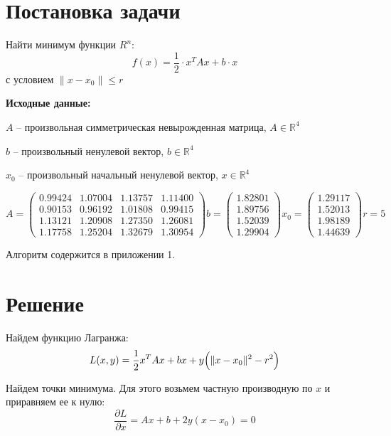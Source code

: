 \documentclass[a4paper, 14pt]{extarticle}
\newenvironment{widerequation}{%
	\begin{adjustwidth}{-2cm}{-2cm}\begin{equation}}
		{\end{equation}\end{adjustwidth}}
\begin{document}
	\pagebreak	

	\section{Постановка задачи}
		Найти минимум функции $R^n$: 
		\[ f(x) = \dfrac{1}{2} \cdot x^TAx + b \cdot x \]
		с условием $\|x - x_0\| \leq r$
		
		\textbf{Исходные данные:}
		
		\hphantom{--}$A$ -- произвольная симметрическая невырожденная матрица, $A \in \mathbb{R}^{4}$
		
		\hphantom{--}$b$	-- произвольный ненулевой вектор, $b \in \mathbb{R}^{4}$ 
		
		\hphantom{--}$x_0$ -- произвольный начальный ненулевой вектор, $ x \in\mathbb{R}^{4} $
		\begin{widerequation}
			A = 
			\begin{pmatrix}
				0.99424 & 1.07004 & 1.13757 & 1.11400\\
				0.90153 & 0.96192 & 1.01808 & 0.99415\\
				1.13121 & 1.20908 & 1.27350 & 1.26081\\
				1.17758 & 1.25204 & 1.32679 & 1.30954
			\end{pmatrix}
			b = 
			\begin{pmatrix} 
				1.82801\\
				1.89756\\
				1.52039\\
				1.29904
			\end{pmatrix}
			x_0 = 
			\begin{pmatrix} 
				1.29117\\
				1.52013\\
				1.98189\\
				1.44639
			\end{pmatrix}	
			r = 5
		\end{widerequation}
 	Алгоритм содержится в приложении 1.
 	\section{Решение}
 		Найдем функцию Лагранжа:
 		\[ L(x,y) = \dfrac{1}{2}x^TAx + bx + y\Bigl(\|x-x_0\|^2 - r^2\Bigr) \]	
 		
 		Найдем точки минимума. Для этого возьмем частную производную по $x$ и приравняем ее к нулю:
 		\[ \dfrac{\partial L}{\partial x} = Ax + b + 2y(x - x_0) = 0 \]
 		\pagebreak
 		
\end{document}
